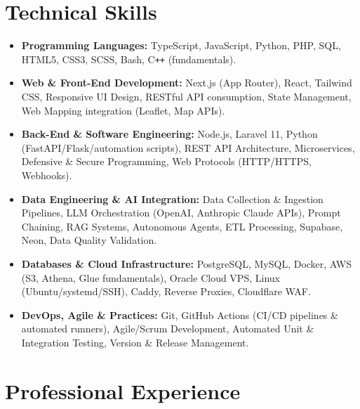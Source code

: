 \documentclass[10pt,a4paper]{article}
\begin{document}
\section{Technical Skills}
\begin{itemize}[leftmargin=1.2em]
    \item \textbf{Programming Languages:} TypeScript, JavaScript, Python, PHP, SQL, HTML5, CSS3, SCSS, Bash, C\texttt{++} (fundamentals).
    \item \textbf{Web \& Front-End Development:} Next.js (App Router), React, Tailwind CSS, Responsive UI Design, RESTful API consumption, State Management, Web Mapping integration (Leaflet, Map APIs).
    \item \textbf{Back-End \& Software Engineering:} Node.js, Laravel 11, Python (FastAPI/Flask/automation scripts), REST API Architecture, Microservices, Defensive \& Secure Programming, Web Protocols (HTTP/HTTPS, Webhooks).
    \item \textbf{Data Engineering \& AI Integration:} Data Collection \& Ingestion Pipelines, LLM Orchestration (OpenAI, Anthropic Claude APIs), Prompt Chaining, RAG Systems, Autonomous Agents, ETL Processing, Supabase, Neon, Data Quality Validation.
    \item \textbf{Databases \& Cloud Infrastructure:} PostgreSQL, MySQL, Docker, AWS (S3, Athena, Glue fundamentals), Oracle Cloud VPS, Linux (Ubuntu/systemd/SSH), Caddy, Reverse Proxies, Cloudflare WAF.
    \item \textbf{DevOps, Agile \& Practices:} Git, GitHub Actions (CI/CD pipelines \& automated runners), Agile/Scrum Development, Automated Unit \& Integration Testing, Version \& Release Management.
\end{itemize}

\section{Professional Experience}
\end{document}
